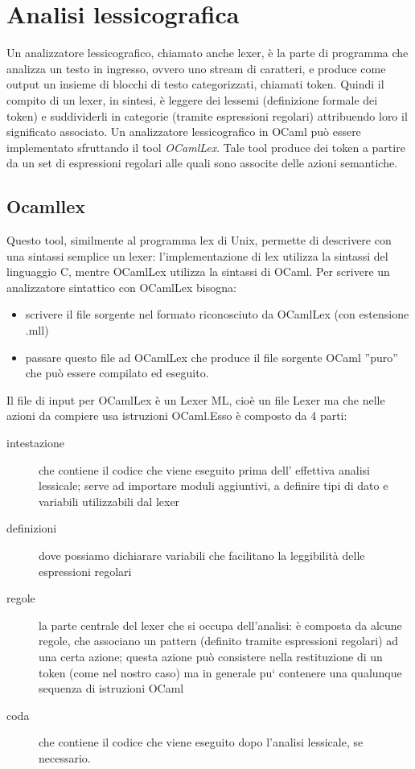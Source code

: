 \documentclass[a4paper,10pt]{article}
\begin{document}
\section{Analisi lessicografica}
Un analizzatore lessicografico, chiamato anche lexer, \`e la parte di programma 
che analizza un testo in ingresso, ovvero uno stream di caratteri, e produce
come output un insieme di blocchi di testo categorizzati, chiamati token.
Quindi il compito di un lexer, in sintesi, \`e leggere dei lessemi (definizione
formale dei token) e suddividerli in categorie (tramite espressioni regolari)
attribuendo loro il significato associato.
Un analizzatore lessicografico in OCaml pu\`o essere implementato sfruttando il 
tool \textit{OCamlLex}.
Tale tool produce dei token a partire da un set di espressioni regolari alle 
quali sono associte delle azioni semantiche.


\subsection{Ocamllex}
Questo tool, similmente al programma lex di Unix, permette di descrivere con una
 sintassi semplice un lexer: l'implementazione di lex utilizza la sintassi del
linguaggio C, mentre OCamlLex utilizza la sintassi di OCaml. Per scrivere un
analizzatore sintattico con OCamlLex bisogna:

\begin{itemize}
\item scrivere il file sorgente nel formato riconosciuto da OCamlLex 
(con estensione .mll)
\item passare questo file ad OCamlLex che produce il file sorgente OCaml ”puro” 
che pu\`o essere compilato ed eseguito.
\end{itemize}

Il file di input per OCamlLex \`e un Lexer ML, cio\`e un file Lexer ma che nelle
 azioni da compiere usa istruzioni OCaml.Esso \`e composto da 4 parti:
\begin{description}
\item [intestazione] che contiene il codice che viene eseguito prima
dell' effettiva analisi lessicale; serve ad importare moduli aggiuntivi, a
definire tipi di dato e variabili utilizzabili dal lexer
\item [definizioni] dove possiamo dichiarare variabili che facilitano la 
leggibilit\`a delle espressioni regolari
\item [regole] la parte centrale del lexer che si occupa dell’analisi: \`e 
composta da alcune regole, che associano un pattern (definito tramite
espressioni regolari) ad una certa azione; questa azione pu\`o consistere nella
restituzione di un token (come nel nostro caso) ma in generale pu` contenere una
qualunque sequenza di istruzioni OCaml
\item [coda] che contiene il codice che viene eseguito dopo l’analisi lessicale,
 se necessario.
\end{description}
\end{document}
